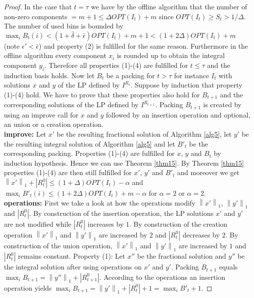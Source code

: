 \documentclass[a4paper,11pt]{article}
\newcommand{\nor}[1]{\left\|#1\right\|}
\begin{document}
\begin{proof}
	In the case that $t = \tau$ we have by the offline algorithm that the number of non-zero components $= m+1
	\leq \Delta \mathit{OPT}(I_t)+m$ since $\mathit{OPT}(I_t) \geq S_t > 1/ \Delta$. The number of used bins is bounded
	by $\max_i B_t (i) < (1+ \bar{\delta} + \bar{\epsilon}) \mathit{OPT}(I_t) +m +1 < (1+ 2\Delta)\mathit{OPT}(I_t) +m$
	(note $\epsilon' < \bar{\epsilon}$) and property (2) is fulfilled for the same reason. Furthermore in the 
	offline algorithm every component $x_i$ is rounded up to obtain the integral component $y_i$. 
	Therefore all properties (1)-(4) are fulfilled for $t \leq \tau$ and the induction basis holds.
	Now let $B_t$ be a packing for $t > \tau$ for instance $I_t$ with solutions $x$ and $y$ of the LP defined by 
	$I^{R_t}$. Suppose
	by induction that property (1)-(4) hold. We have to prove that these properties also hold for $B_{t+1}$ and the
	corresponding solutions of the LP defined by $I^{R_{t+1}}$. Packing $B_{t+1}$ is created by using an
	improve call for $x$ and $y$ followed by an insertion operation and optional, an union or a creation operation.
	\\{\bf improve:} Let $x'$ be the resulting fractional solution of Algorithm \ref{alg5}, let $y'$ be the resulting integral solution
	of Algorithm \ref{alg5} and let $B'_t$ be the corresponding packing. Properties (1)-(4) are fulfilled 
	for $x$, $y$ and $B_t$ by induction hypothesis. Hence we can use Theorem \ref{thm15}. 
	By Theorem \ref{thm15} properties (1)-(4) are then still fulfilled for $x'$, $y'$ and $B'_t$ and moreover we get
	$\nor{x'}_1 + |R_{t}^0| \leq (1+ \Delta) \mathit{OPT}(I_t)- \alpha$ and 
	$\max_i B'_t (i) \leq (1+ 2 \Delta) \mathit{OPT}(I_t) + m - \alpha$ for $\alpha = 2$ or $\alpha = 2$.
	\\{\bf operations:} First we take a look at how the operations modify $\nor{x'}_1$, $\nor{y'}_1$ and $|R_{t}^0|$.
	By construction of the insertion operation, the LP solutions $x'$ and $y'$ are not modified while $|R_{t}^0|$
	increases by $1$. By construction of the creation operation $\nor{x'}_1$ and $\nor{y'}_1$ are increased by $2$
	and $|R_{t}^0|$ decreases by $2$. By construction of the union operation, $\nor{x'}_1$ and $\nor{y'}_1$ 
	are increased by $1$ and $|R_{t}^0|$ remains constant.
	Property (1): Let $x''$ be the fractional solution and $y''$ be the integral solution after using operations 
	on $x'$ and $y'$. Packing $B_{t+1}$ equals $\max_i B_{t+1} = \nor{y''}_1 + |R^{0}_{t+1}|$. According to the operations
	an insertion operation yields $\max_i B_{t+1} = \nor{y'}_1 + |R^{0}_{t}| +1 = \max_i B'_t +1$.

\end{proof}
\end{document}
